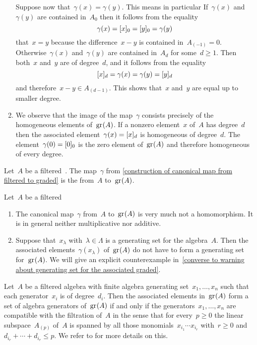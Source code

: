 \begin{fluff}
\begin{enumerate}
			Suppose now that~$\gamma(x) = \gamma(y)$.
			This means in particular
			If~$\gamma(x)$ and~$\gamma(y)$ are contained in~$A_0$ then it follows from the equality
			\[
				\gamma(x)
				=
				\lbrack x\rbrack_0
				=
				\lbrack y\rbrack_0
				=
				\gamma(y)
			\]
			that~$x = y$ because the difference~$x - y$ is contained in~$A_{(-1)} = 0$.
			Otherwise~$\gamma(x)$ and~$\gamma(y)$ are contained in~$A_d$ for some~$d \geq 1$.
			Then both~$x$ and~$y$ are of degree~$d$, and it follows from the equality
			\[
				\lbrack x\rbrack_d
				=
				\gamma(x)
				=
				\gamma(y)
				=
				\lbrack y\rbrack_d
			\]
			and therefore~$x - y \in A_{(d-1)}$.
			This shows that~$x$ and~$y$ are equal up to smaller degree.
		\item
			We observe that the image of the map~$\gamma$ consists precisely of the homogeneous elements of~$\gr(A)$.
			If a nonzero element~$x$ of~$A$ has degree~$d$ then the associated element~$\gamma(x) = \lbrack x\rbrack_d$ is homogeneous of degree~$d$.
			The element~$\gamma(0) = \lbrack0\rbrack_0$ is the zero element of~$\gr(A)$ and therefore homogeneous of every degree.
	\end{enumerate}
\end{fluff}


\begin{definition}
	Let~$A$ be a filtered~\algebra{$\kf$}.
	The map~$\gamma$ from \cref{construction of canonical map from filtered to graded} is the  from~$A$ to~$\gr(A)$.
\end{definition}



\begin{warning}
	\label{generators of associated graded}
	Let~$A$ be a filtered~{\algebra{$\kf$}}
	\begin{enumerate}
		\item
			The canonical map~$\gamma$ from~$A$ to~$\gr(A)$ is very much not a homomorphism.
			It is in general neither multiplicative nor additive.
		\item
			\label{generators of associated graded part}
			Suppose that~$x_\lambda$ with~$\lambda \in \Lambda$ is a generating set for the algebra~$A$.
			Then the associated elements~$\gamma(x_\lambda)$ of~$\gr(A)$ do not have to form a generating set for~$\gr(A)$.
			We will give an explicit counterexample in~\cref{converse to warning about generating set for the associated graded}.
	\end{enumerate}
\end{warning}


\begin{remark}
	Let~$A$ be a filtered algebra with finite algebra generating set~$x_1, \dotsc, x_n$ such that each generator~$x_i$ is of degree~$d_i$.
	Then the associated elements in~$\gr(A)$ form a set of algebra generators of~$\gr(A)$ if and only if the generators~$x_1, \dotsc, x_n$ are compatible with the filtration of~$A$ in the sense that for every~$p \geq 0$ the linear subspace~$A_{(p)}$ of~$A$ is spanned by all those monomials~$x_{i_1} \dotsm x_{i_r}$ with~$r \geq 0$ and~$d_{i_r} + \dotsb + d_{i_r} \leq p$.
	We refer to \cite{associated_generated} for more details on this.
\end{remark}

